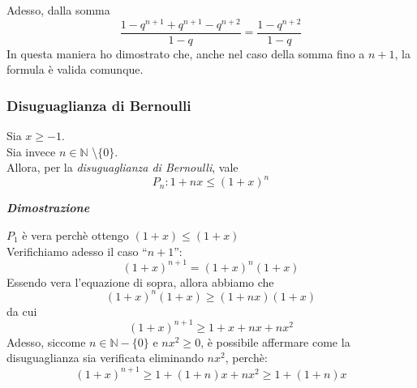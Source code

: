 \documentclass{article}
\theoremstyle{definition}
\newcommand{\virgolette}[1]{``#1''}
\begin{document}
Adesso, dalla somma
\begin{equation}
    \frac{1-q^{n+1}+q^{n+1}-q^{n+2}}{1-q}=\frac{1-q^{n+2}}{1-q}
\end{equation}
In questa maniera ho dimostrato che, anche nel caso della somma fino a $n+1$, la formula è valida comunque.

\subsubsection{Disuguaglianza di Bernoulli}
Sia $x \geqslant -1$.
\\ Sia invece $n \in \mathbb{N}$ \textbackslash $\{0\}$.
\\
Allora, per la \textit{disuguaglianza di Bernoulli}, vale
\begin{equation}
  P_n:  1+nx \leqslant (1+x)^n
\end{equation}
\begin{center}
    \textbf{\textit{Dimostrazione}}
\end{center}
$P_1$ è vera perchè ottengo $(1+x) \leqslant (1+x)$
\\
Verifichiamo adesso il caso \virgolette{$n+1$}:
\\
\begin{equation}
    (1+x)^{n+1}=(1+x)^n(1+x)
\end{equation}
Essendo vera l'equazione di sopra, allora abbiamo che
\begin{equation}
    (1+x)^n(1+x) \geqslant (1+nx)(1+x)
\end{equation}
da cui
\begin{equation}
    (1+x)^{n+1}\geqslant 1+x+nx+nx^2
\end{equation}
Adesso, siccome $n \in \mathbb{N}-\{0\}$ e $nx^2 \geqslant 0$, è possibile affermare come la disuguaglianza sia verificata eliminando $nx^2$, perchè:
\begin{equation}
    (1+x)^{n+1} \geqslant 1+ (1+n)x + nx^2 \geqslant 1+ (1+n)x
\end{equation}

\newpage
\end{document}
